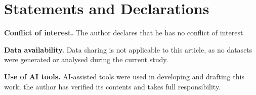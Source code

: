 \documentclass[reqno]{amsart}
\theoremstyle{plain}
\theoremstyle{definition}
\theoremstyle{remark}
\begin{document}
\section*{Statements and Declarations}
\smallskip

\noindent\textbf{Conflict of interest.} The author declares that he has no
conflict of interest.

\smallskip

\noindent\textbf{Data availability.} Data sharing is not applicable to this
article, as no datasets were generated or analysed during the current study.

\smallskip

\noindent\textbf{Use of AI tools.} AI-assisted tools were used in developing and drafting this
work; the author has verified its contents and takes full responsibility.
\end{document}
